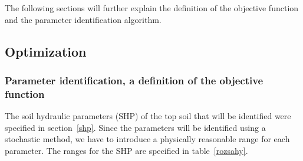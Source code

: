 \documentclass[review,times,3p,twocolumn,10pt]{elsarticle}
\begin{document}


The following sections will further explain the definition of the objective function and the parameter identification algorithm.



\subsection{Optimization}

\subsubsection{Parameter identification, a definition of the objective function} %
\label{objdef}

The soil hydraulic parameters (SHP) of the top soil that will be identified were specified in section~\ref{shp}.
Since the parameters will be identified using a stochastic method, we have to introduce a physically reasonable range for each parameter. The ranges for the SHP are specified in table~\ref{rozsahy}.
\end{document}
